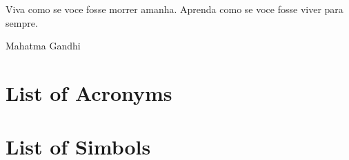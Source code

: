 \documentclass{ufpatcc}
\begin{document}

\begin{ufpaEpigrafe}
Viva como se voce fosse morrer amanha. Aprenda como se voce fosse viver para sempre.\\
\begin{flushright}Mahatma Gandhi\end{flushright}
\end{ufpaEpigrafe}


\chapter*{List of Acronyms} \label{sec:siglas}


\chapter*{List of Simbols} \label{sec:simbolos}



\listoffigures \clearpage \listoftables \clearpage


\tableofcontents    \clearpage

\end{document}
